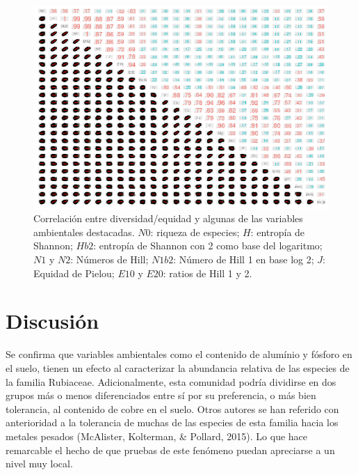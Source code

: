 \documentclass[11pt,]{article}
\begin{document}
\begin{figure}
\centering
\includegraphics[height=0.50000\textwidth]{panel_cor_indcs_diversidad1_columnas_quitadas.png}
\caption{Correlación entre diversidad/equidad y algunas de las variables
ambientales destacadas. \(N0\): riqueza de especies; \(H\): entropía de
Shannon; \(Hb2\): entropía de Shannon con 2 como base del logaritmo;
\(N1\) y \(N2\): Números de Hill; \(N1b2\): Número de Hill 1 en base log
2; \(J\): Equidad de Pielou; \(E10\) y \(E20\): ratios de Hill 1 y 2.
\label{fig:panel_cor_indics_diversidad1_columnnas_quitadas}}
\end{figure}

\section{Discusión}\label{discusiuxf3n}

Se confirma que variables ambientales como el contenido de alumínio y
fósforo en el suelo, tienen un efecto al caracterizar la abundancia
relativa de las especies de la familia Rubiaceae. Adicionalmente, esta
comunidad podría dividirse en dos grupos más o menos diferenciados entre
sí por su preferencia, o más bien tolerancia, al contenido de cobre en
el suelo. Otros autores se han referido con anterioridad a la tolerancia
de muchas de las especies de esta familia hacia los metales pesados
(McAlister, Kolterman, \& Pollard, 2015). Lo que hace remarcable el
hecho de que pruebas de este fenómeno puedan apreciarse a un nivel muy
local.
\end{document}
